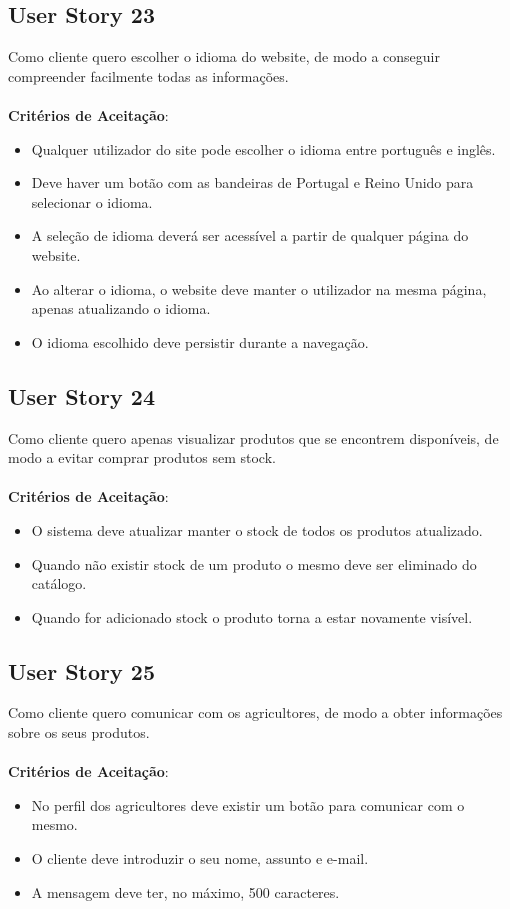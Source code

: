\documentclass[a4paper,11pt]{article}
\begin{document}
\subsection{User Story 23}
Como cliente quero escolher o idioma do website, de modo a conseguir compreender facilmente todas as informações.\\\\
\textbf{Critérios de Aceitação}:
\begin{itemize}
  \item Qualquer utilizador do site pode escolher o idioma entre português e inglês.
  \item Deve haver um botão com as bandeiras de Portugal e Reino Unido para selecionar o idioma.
  \item A seleção de idioma deverá ser acessível a partir de qualquer página do website.
  \item Ao alterar o idioma, o website deve manter o utilizador na mesma página, apenas atualizando o idioma.
  \item O idioma escolhido deve persistir durante a navegação.
\end{itemize}
\subsection{User Story 24}
Como cliente quero apenas visualizar produtos que se encontrem disponíveis, de modo a evitar comprar produtos sem stock.\\\\
\textbf{Critérios de Aceitação}:
\begin{itemize}
  \item O sistema deve atualizar manter o stock de todos os produtos atualizado.
  \item Quando não existir stock de um produto o mesmo deve ser eliminado do catálogo.
  \item Quando for adicionado stock o produto torna a estar novamente visível.
\end{itemize}
\subsection{User Story 25}
Como cliente quero comunicar com os agricultores, de modo a obter informações sobre os seus produtos.\\\\
\textbf{Critérios de Aceitação}:
\begin{itemize}
  \item No perfil dos agricultores deve existir um botão para comunicar com o mesmo.
  \item O cliente deve introduzir o seu nome, assunto e e-mail.
  \item A mensagem deve ter, no máximo, 500 caracteres.
\end{itemize}
\end{document}
